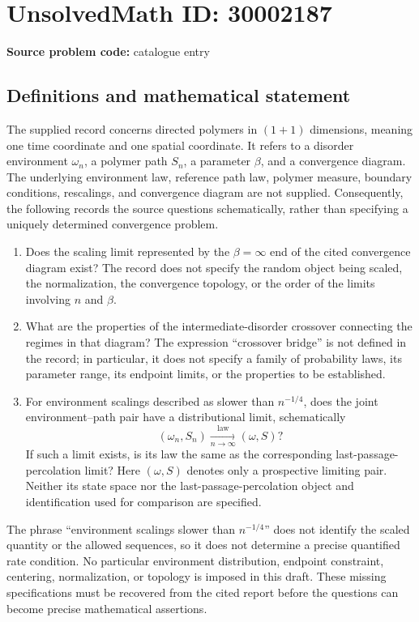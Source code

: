 \documentclass[11pt]{article}
\begin{document}
\section*{UnsolvedMath ID: 30002187}
\textbf{Source problem code:} catalogue entry
\subsection{Definitions and mathematical statement}
The supplied record concerns directed polymers in $(1+1)$ dimensions, meaning one time coordinate and one spatial coordinate. It refers to a disorder environment $\omega_n$, a polymer path $S_n$, a parameter $\beta$, and a convergence diagram. The underlying environment law, reference path law, polymer measure, boundary conditions, rescalings, and convergence diagram are not supplied. Consequently, the following records the source questions schematically, rather than specifying a uniquely determined convergence problem.

\begin{enumerate}
\item Does the scaling limit represented by the $\beta=\infty$ end of the cited convergence diagram exist? The record does not specify the random object being scaled, the normalization, the convergence topology, or the order of the limits involving $n$ and $\beta$.
\item What are the properties of the intermediate-disorder crossover connecting the regimes in that diagram? The expression ``crossover bridge'' is not defined in the record; in particular, it does not specify a family of probability laws, its parameter range, its endpoint limits, or the properties to be established.
\item For environment scalings described as slower than $n^{-1/4}$, does the joint environment--path pair have a distributional limit, schematically
\[
(\omega_n,S_n)\xrightarrow[n\to\infty]{\mathrm{law}}(\omega,S)?
\]
If such a limit exists, is its law the same as the corresponding last-passage-percolation limit? Here $(\omega,S)$ denotes only a prospective limiting pair. Neither its state space nor the last-passage-percolation object and identification used for comparison are specified.
\end{enumerate}

The phrase ``environment scalings slower than $n^{-1/4}$'' does not identify the scaled quantity or the allowed sequences, so it does not determine a precise quantified rate condition. No particular environment distribution, endpoint constraint, centering, normalization, or topology is imposed in this draft. These missing specifications must be recovered from the cited report before the questions can become precise mathematical assertions.
\end{document}
